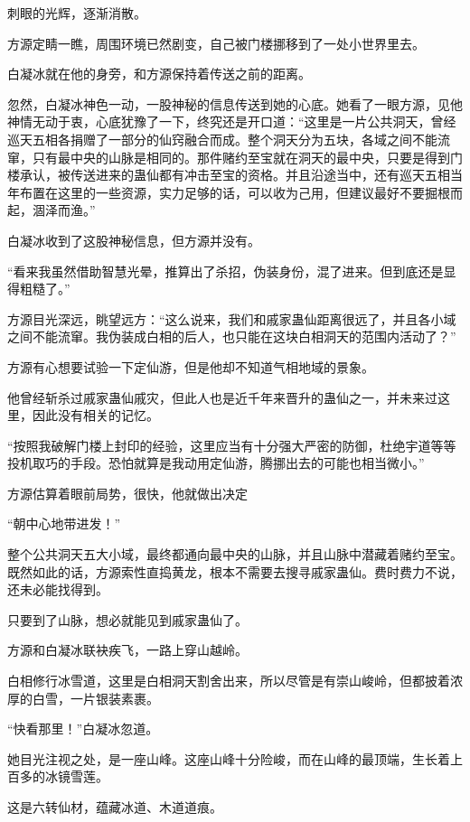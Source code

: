 
\begin{this_body}

刺眼的光辉，逐渐消散。

方源定睛一瞧，周围环境已然剧变，自己被门楼挪移到了一处小世界里去。

白凝冰就在他的身旁，和方源保持着传送之前的距离。

忽然，白凝冰神色一动，一股神秘的信息传送到她的心底。她看了一眼方源，见他神情无动于衷，心底犹豫了一下，终究还是开口道：“这里是一片公共洞天，曾经巡天五相各捐赠了一部分的仙窍融合而成。整个洞天分为五块，各域之间不能流窜，只有最中央的山脉是相同的。那件赌约至宝就在洞天的最中央，只要是得到门楼承认，被传送进来的蛊仙都有冲击至宝的资格。并且沿途当中，还有巡天五相当年布置在这里的一些资源，实力足够的话，可以收为己用，但建议最好不要掘根而起，涸泽而渔。”

白凝冰收到了这股神秘信息，但方源并没有。

“看来我虽然借助智慧光晕，推算出了杀招，伪装身份，混了进来。但到底还是显得粗糙了。”

方源目光深远，眺望远方：“这么说来，我们和戚家蛊仙距离很远了，并且各小域之间不能流窜。我伪装成白相的后人，也只能在这块白相洞天的范围内活动了？”

方源有心想要试验一下定仙游，但是他却不知道气相地域的景象。

他曾经斩杀过戚家蛊仙戚灾，但此人也是近千年来晋升的蛊仙之一，并未来过这里，因此没有相关的记忆。

“按照我破解门楼上封印的经验，这里应当有十分强大严密的防御，杜绝宇道等等投机取巧的手段。恐怕就算是我动用定仙游，腾挪出去的可能也相当微小。”

方源估算着眼前局势，很快，他就做出决定

“朝中心地带进发！”

整个公共洞天五大小域，最终都通向最中央的山脉，并且山脉中潜藏着赌约至宝。既然如此的话，方源索性直捣黄龙，根本不需要去搜寻戚家蛊仙。费时费力不说，还未必能找得到。

只要到了山脉，想必就能见到戚家蛊仙了。

方源和白凝冰联袂疾飞，一路上穿山越岭。

白相修行冰雪道，这里是白相洞天割舍出来，所以尽管是有崇山峻岭，但都披着浓厚的白雪，一片银装素裹。

“快看那里！”白凝冰忽道。

她目光注视之处，是一座山峰。这座山峰十分险峻，而在山峰的最顶端，生长着上百多的冰镜雪莲。

这是六转仙材，蕴藏冰道、木道道痕。


\end{this_body}

